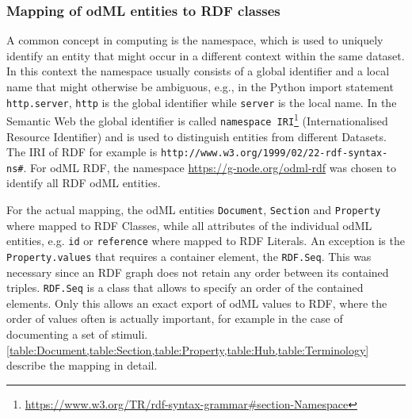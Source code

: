 \documentclass{article}
\begin{document}
\subsubsection{Mapping of odML entities to RDF classes} \label{sec:odml_rdf_mapping}

A common concept in computing is the namespace, which is used to uniquely identify an entity that might occur in a different context within the same dataset. In this context the namespace usually consists of a global identifier and a local name that might otherwise be ambiguous, e.g., in the Python import statement \texttt{http.server}, \texttt{http} is the global identifier while \texttt{server} is the local name.
In the Semantic Web the global identifier is called \texttt{namespace IRI}\footnote{\url{https://www.w3.org/TR/rdf-syntax-grammar\#section-Namespace}} (Internationalised Resource Identifier) and is used to distinguish entities from different Datasets. The IRI of RDF for example is \texttt{http://www.w3.org/1999/02/22-rdf-syntax-ns\#}. For odML RDF, the namespace \url{https://g-node.org/odml-rdf} was chosen to identify all RDF odML entities.

For the actual mapping, the odML entities \texttt{Document}, \texttt{Section} and \texttt{Property} where mapped to RDF Classes, while all attributes of the individual odML entities, e.g. \texttt{id} or \texttt{reference} where mapped to RDF Literals. An exception is the \texttt{Property.values} that requires a container element, the \texttt{RDF.Seq}. This was necessary since an RDF graph does not retain any order between its contained triples. \texttt{RDF.Seq} is a class that allows to specify an order of the contained elements. Only this allows an exact export of odML values to RDF, where the order of values often is actually important, for example in the case of documenting a set of stimuli. \cref{table:Document,table:Section,table:Property,table:Hub,table:Terminology} describe the mapping in detail.
\end{document}

